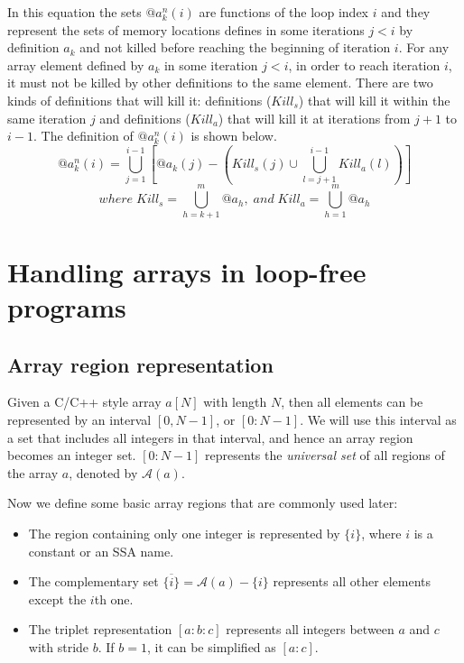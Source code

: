 \documentclass[12pt]{gatech-thesis}
\begin{document}
In this equation the sets $@a_k^n(i)$ are functions of the loop index $i$ and they represent the sets of memory locations defines in some iterations $j<i$ by definition $a_k$ and not killed before reaching the beginning of iteration $i$. 
For any array element defined by $a_k$ in some iteration $j < i$, in order to reach iteration $i$, it must not be killed by other definitions to the same element. 
There are two kinds of definitions that will kill it: definitions ($Kill_s$) that will kill it within the same iteration $j$ and definitions ($Kill_a$) that will kill it at iterations from $j +1$ to $i-1$.
The definition of $@a_k^n(i)$ is shown below.
 $$@a_k^n(i)=\bigcup_{j=1}^{i-1}\left[@a_k(j)-\left(Kill_s(j) \cup \bigcup_{l=j+1}^{i-1}Kill_a(l)\right)\right]$$
 $$ where \; Kill_s = \bigcup_{h=k+1}^m @a_h, \; and \; Kill_a=\bigcup_{h=1}^m@a_h$$


\section{Handling arrays in loop-free programs}

\subsection{Array region representation}

Given a C/C++ style array $a[N]$ with length $N$, then all elements can be represented by an interval $[0,N-1]$, or $[0:N-1]$. 
We will use this interval as a set that includes all integers in that interval, and hence an array region becomes an integer set.
$[0:N-1]$ represents the \emph{universal set} of all regions of the array $a$, denoted by $\mathcal{A}(a)$. 

Now we define some basic array regions that are commonly used later:

\begin{itemize}
\item The region containing only one integer is represented by $\{i\}$, where $i$ is a constant or an SSA name. 
\item The complementary set $\overline{\{i\}} = \mathcal{A}(a)-\{i\}$ represents all other elements except the $i$th one. 

\item The triplet representation $[a:b:c]$ represents all integers between $a$ and $c$ with stride $b$. If $b=1$, it can be simplified as $[a:c]$. 

\end{itemize}
\end{document}
